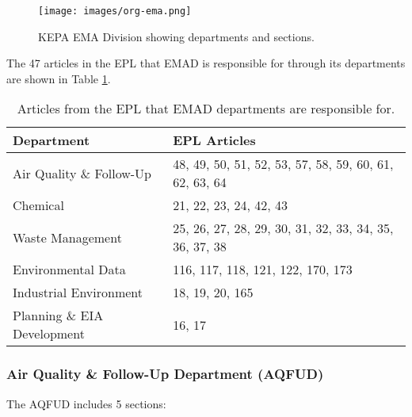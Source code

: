 %
\begin{figure}[H]
\centering
\texttt{[image: images/org-ema.png]} 
\caption{KEPA EMA Division showing departments and sections.}
\label{fig:emaorg}
\end{figure}
%

The 47 articles in the EPL that EMAD is responsible for through its departments are shown in Table \ref{tab:emadarts}.

\begin{table}[!htpb]
\centering
\caption{Articles from the EPL that EMAD departments are responsible for.}
\label{tab:emadarts}
\begin{tabular}{@{}ll@{}}
\toprule
\textbf{Department} & \textbf{EPL Articles} \\ \midrule
Air Quality \& Follow-Up & 48, 49, 50, 51, 52, 53, 57, 58, 59, 60, 61, 62, 63, 64 \\
Chemical & 21, 22, 23, 24, 42, 43 \\
Waste Management & 25, 26, 27, 28, 29, 30, 31, 32, 33, 34, 35, 36, 37, 38 \\
Environmental Data & 116, 117, 118, 121, 122, 170, 173 \\
Industrial Environment & 18, 19, 20, 165 \\
Planning \&  EIA Development & 16, 17 \\ \bottomrule
\end{tabular}
\end{table}

\subsubsection{Air Quality \& Follow-Up Department (AQFUD)}
The AQFUD includes 5 sections:

